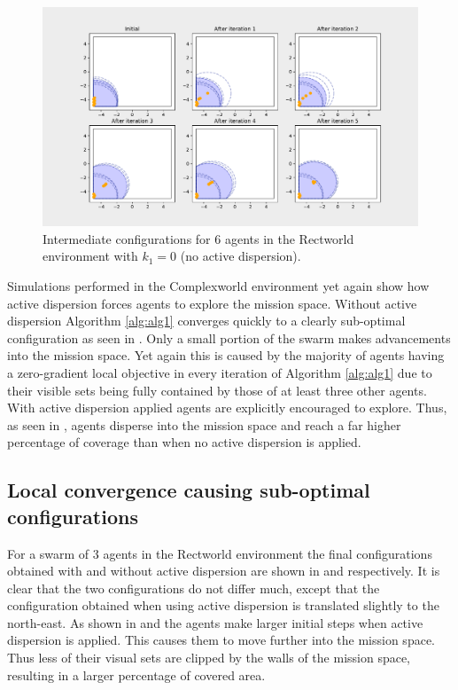 \begin{figure}[H]
  \centering
  \includegraphics[width=\textwidth]{figs/bigworld_6_agnt_k_1_0_k_2_1_x_traj.pdf}
  \caption{Intermediate configurations for 6 agents in the Rectworld environment with $k_{1} = 0$ (no active dispersion).}
  \label{fig:bw_x_traj}
\end{figure}

Simulations performed in the Complexworld environment yet again show how active dispersion forces agents to explore the mission space. Without active dispersion Algorithm \ref{alg:alg1} converges quickly to a clearly sub-optimal
configuration as seen in . Only a small portion of the swarm makes advancements into the mission space. Yet again this is caused by the majority of agents having a zero-gradient
local objective in every iteration of Algorithm \ref{alg:alg1} due to their visible sets being fully contained by those of at least three other agents. With active dispersion applied agents are explicitly encouraged to explore. Thus, as seen in , agents disperse into the mission space and 
reach a far higher percentage of coverage than when no active dispersion is applied.

\subsection{Local convergence causing sub-optimal configurations}
For a swarm of 3 agents in the Rectworld environment the final configurations obtained with 
and without active dispersion are shown in 
 and  respectively. It is clear that the two configurations do not differ much, except that the configuration obtained when using active dispersion
is translated slightly to the north-east. As shown in  and  the agents make larger initial steps when active dispersion is applied. This
causes them to move further into the mission space. Thus less of their visual sets are clipped by the walls of the mission space, resulting in a larger percentage of covered area.

